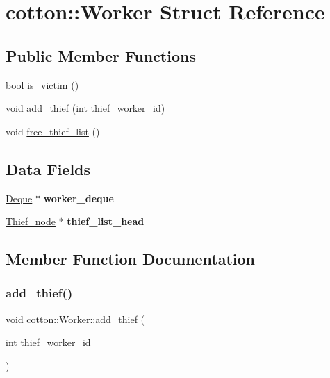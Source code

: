 \hypertarget{structcotton_1_1Worker}{}\section{cotton\+:\+:Worker Struct Reference}
\label{structcotton_1_1Worker}
\subsection*{Public Member Functions}
\begin{DoxyCompactItemize}
\item 
bool \mbox{\hyperlink{structcotton_1_1Worker_a1c6114b25a55f514124704d2073a9a9a}{is\+\_\+victim}} ()
\item 
void \mbox{\hyperlink{structcotton_1_1Worker_a8e28883823dae5e4c840236ab7168c00}{add\+\_\+thief}} (int thief\+\_\+worker\+\_\+id)
\item 
void \mbox{\hyperlink{structcotton_1_1Worker_a2c5e25bbc0b0e2417281ed2832b728a5}{free\+\_\+thief\+\_\+list}} ()
\end{DoxyCompactItemize}
\subsection*{Data Fields}
\begin{DoxyCompactItemize}
\item 
\mbox{\label{structcotton_1_1Worker_abc5dad171263747fea30a5a0cf617c3b}} 
\mbox{\hyperlink{structcotton_1_1Deque}{Deque}} $\ast$ {\bfseries worker\+\_\+deque}
\item 
\mbox{\label{structcotton_1_1Worker_ae1e4d32682edf2db3ec7839c92a61551}} 
\mbox{\hyperlink{structcotton_1_1Thief__node}{Thief\+\_\+node}} $\ast$ {\bfseries thief\+\_\+list\+\_\+head}
\end{DoxyCompactItemize}


\subsection{Member Function Documentation}
\mbox{\label{structcotton_1_1Worker_a8e28883823dae5e4c840236ab7168c00}} 
\subsubsection{\texorpdfstring{add\+\_\+thief()}{add\_thief()}}
{\footnotesize\ttfamily void cotton\+::\+Worker\+::add\+\_\+thief (\begin{DoxyParamCaption}\item[{int}]{thief\+\_\+worker\+\_\+id }\end{DoxyParamCaption})}

